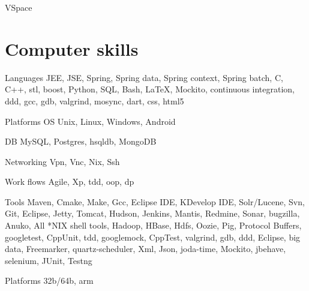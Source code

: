 

    {VSpace}

\section{Computer skills}

\cvline
    {Languages}
    {JEE, JSE, Spring, Spring data, Spring context, Spring batch, C, C++, stl, boost, Python, SQL, Bash, \LaTeX, Mockito, continuous integration, ddd, gcc, gdb, valgrind, mosync, dart, css, html5}
    {}{}{}{}

\cvline
    {Platforms OS}
    {Unix, Linux, Windows, Android}
    {}{}{}{}

\cvline
    {DB}
    {MySQL, Postgres, hsqldb, MongoDB}
    {}{}{}{}

\cvline
    {Networking}
    {Vpn, Vnc, Nix, Ssh}
    {}{}{}{}

\cvline
    {Work flows}
    {Agile, Xp, tdd, oop, dp}
    {}{}{}{}

\cvline
    {Tools}
    {Maven, Cmake, Make, Gcc, Eclipse IDE, KDevelop IDE, Solr/Lucene, Svn, Git, Eclipse, Jetty, Tomcat, Hudson, Jenkins, Mantis, Redmine, Sonar, bugzilla, Anuko, All *NIX shell tools, Hadoop, HBase, Hdfs, Oozie, Pig, Protocol Buffers, googletest, CppUnit, tdd, googlemock, CppTest, valgrind, gdb, ddd, Eclipse, big data, Freemarker, quartz-scheduler, Xml, Json, joda-time, Mockito, jbehave, selenium, JUnit, Testng}
    {}{}{}{}

\cvline
    {Platforms}
    {32b/64b, arm}
    {}{}{}{}
%
